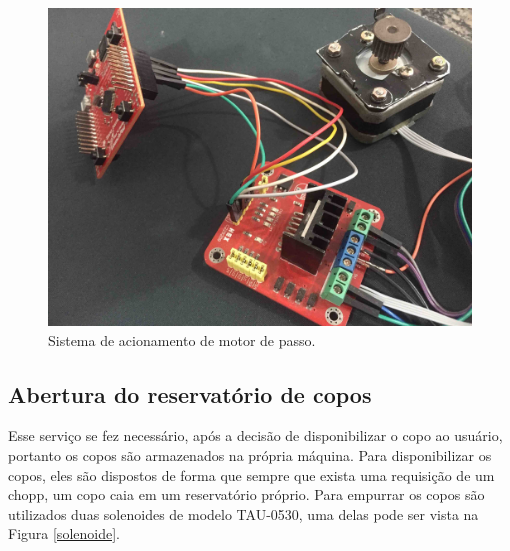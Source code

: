 \begin{figure}[!h]
            \centering
         	\includegraphics[scale= 0.08]{figuras/motor.jpg}
            \caption{Sistema de acionamento de motor de passo.}
            \label{motor}
\end{figure}

\newpage
\subsection{Abertura do reservatório de copos}

 Esse serviço se fez necessário, após a decisão de disponibilizar o copo ao usuário, 
 portanto os copos são  armazenados na própria máquina. Para disponibilizar os copos, 
 eles são dispostos de forma que sempre que exista uma requisição de um chopp, 
 um copo caia em um reservatório próprio. Para empurrar os copos são utilizados duas 
 solenoides de modelo TAU-0530, uma delas pode ser vista na Figura \ref{solenoide}. 

